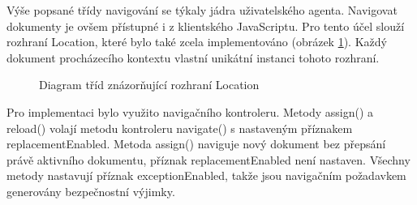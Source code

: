 Výše popsané třídy navigování se týkaly jádra uživatelského agenta. Navigovat dokumenty je ovšem přístupné i z klientského JavaScriptu. Pro tento účel slouží rozhraní Location, které bylo také zcela implementováno (obrázek \ref{Figure.Location}). Každý dokument procházecího kontextu vlastní unikátní instanci tohoto rozhraní.
 
\begin{figure}[H]
  \begin{center}
    \caption{Diagram tříd znázorňující rozhraní Location}
    \label{Figure.Location}
  \end{center}
\end{figure}
 
Pro implementaci bylo využito navigačního kontroleru. Metody assign() a reload() volají metodu kontroleru navigate() s nastaveným příznakem replacementEnabled. Metoda assign() naviguje nový dokument bez přepsání právě aktivního dokumentu, příznak replacementEnabled není nastaven. Všechny metody nastavují příznak exceptionEnabled, takže jsou navigačním požadavkem generovány bezpečnostní výjimky.


